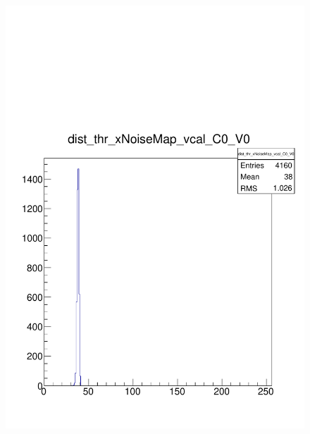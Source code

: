 \documentclass[a4paper,12pt,twoside]{article}
\begin{document}
\begin{figure} [h!]
\begin{minipage}{.48\textwidth}
  \includegraphics[width=\textwidth]{./HRSCurves_thrDist.pdf}
  \label{HRSCurves-thrDist}
\end{minipage}
\end{figure}
\end{document}

